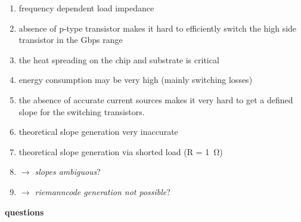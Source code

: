 \begin{enumerate}
	\item frequency dependent load impedance
	\item absence of p-type transistor makes it hard to efficiently switch the high side transistor in the Gbps range
	\item the heat spreading on the chip and substrate is critical
	\item energy consumption may be very high (mainly switching losses)
	\item the absence of accurate current sources makes it very hard to get a defined slope for the switching transistors.
	\item theoretical slope generation very inaccurate
	\item theoretical slope generation via shorted load  (R = \SI{1}{\ohm})
	\item \textit {$\rightarrow$ slopes ambiguous}?	
	\item \textit{$\rightarrow$ riemanncode generation not possible}?                                                                                                                                                                                                                                                                                                                                                                                                                                                                                                                                                                                                                                                                                                                                                                                                                                                                                                                                                                                                                                                                                                                                                                                                                                                                                                                                                                                                                                             
\end{enumerate}
\vspace{1cm}
\textbf{questions}
